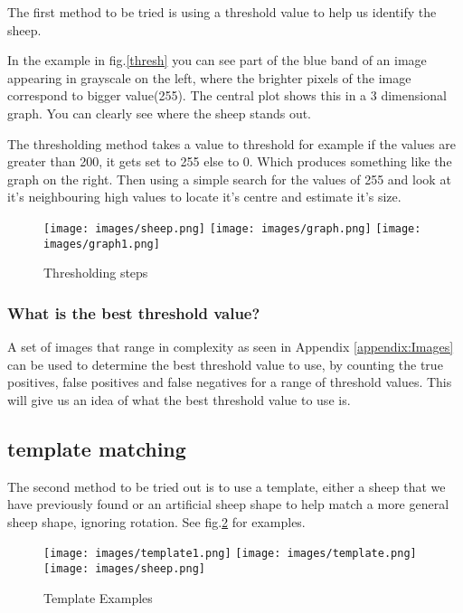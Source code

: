 The first method to be tried is using a threshold value to help us identify the sheep\cite{opencv-t}. 
    
In the example in fig.\ref{thresh} you can see part of the blue band of an image appearing in grayscale on the left, where the brighter pixels of the image correspond to bigger value(255). The central plot shows this in a 3 dimensional graph. You can clearly see where the sheep stands out. 
    
The thresholding method takes a value to threshold for example if the values are greater than 200, it gets set to 255 else to 0. Which produces something like the graph on the right. Then using a simple search for the values of 255 and look at it's neighbouring high values to locate it's centre and estimate it's size.
    
\begin{figure}
    \centering
    \texttt{[image: images/sheep.png]}
    \texttt{[image: images/graph.png]}
    \texttt{[image: images/graph1.png]}
    \caption{Thresholding steps}
    \label{fig:thresh}
\end{figure}

\subsubsection{What is the best threshold value?}

A set of images that range in complexity as seen in Appendix \ref{appendix:Images} can be used to determine the best threshold value to use, by counting the true positives, false positives and false negatives for a range of threshold values. This will give us an idea of what the best threshold value to use is.

\subsection{template matching}

The second method to be tried out is to use a template, either a sheep that we have previously found or an artificial sheep shape to help match a more general sheep shape, ignoring rotation. See fig.\ref{templates} for examples.
    
    \begin{figure}
        \caption{Template Examples}
        \texttt{[image: images/template1.png]}
        \texttt{[image: images/template.png]}
        \texttt{[image: images/sheep.png]}
        \label{templates}
    \end{figure}
    
